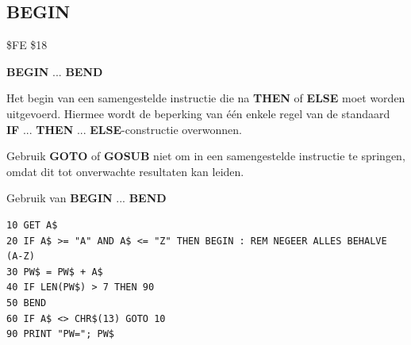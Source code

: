 \subsection{BEGIN}
\begin{description}[leftmargin=2cm,style=nextline]
\item [Token:]   \$FE \$18

\item [Formaat:]  {\bf BEGIN} ... {\bf BEND}

\item [Gebruik:]   Het begin van een samengestelde instructie die na {\bf THEN} of {\bf ELSE} moet worden uitgevoerd. Hiermee wordt de beperking van één enkele regel van de standaard {\bf IF} ... {\bf THEN} ... {\bf ELSE}-constructie overwonnen.

\item [Opmerkingen:] Gebruik {\bf GOTO} of {\bf GOSUB} niet om in een samengestelde instructie te springen, omdat dit tot onverwachte resultaten kan leiden.

\item [Voorbeeld:] Gebruik van {\bf BEGIN} ... {\bf BEND}

\begin{tcolorbox}[colback=black,coltext=white]
\verbatimfont{\codefont}
\begin{verbatim}
10 GET A$
20 IF A$ >= "A" AND A$ <= "Z" THEN BEGIN : REM NEGEER ALLES BEHALVE (A-Z)
30 PW$ = PW$ + A$
40 IF LEN(PW$) > 7 THEN 90
50 BEND
60 IF A$ <> CHR$(13) GOTO 10
90 PRINT "PW="; PW$
\end{verbatim}
\end{tcolorbox}
\end{description}


\newpage
